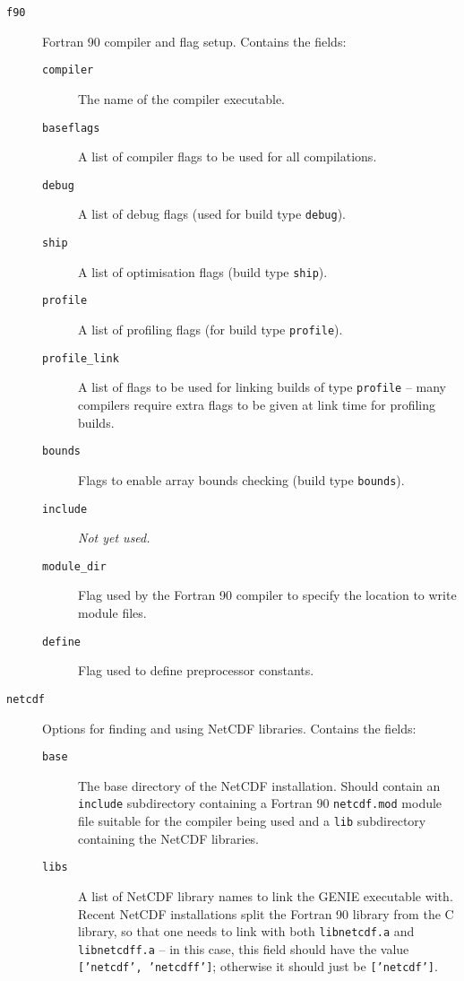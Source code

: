 \documentclass[a4paper,10pt,article]{memoir}
\begin{document}
\begin{description}
  \item[\texttt{f90}]{Fortran 90 compiler and flag setup.  Contains
    the fields:
    \begin{description}
      \item[\texttt{compiler}]{The name of the compiler executable.}
      \item[\texttt{baseflags}]{A list of compiler flags to be used
        for all compilations.}
      \item[\texttt{debug}]{A list of debug flags (used for build type
        \texttt{debug}).}
      \item[\texttt{ship}]{A list of optimisation flags (build type
        \texttt{ship}).}
      \item[\texttt{profile}]{A list of profiling flags (for build type
        \texttt{profile}).}
      \item[\texttt{profile\_link}]{A list of flags to be used for
        linking builds of type \texttt{profile} -- many compilers
        require extra flags to be given at link time for profiling
        builds.}
      \item[\texttt{bounds}]{Flags to enable array bounds checking
        (build type \texttt{bounds}).}
      \item[\texttt{include}]{\emph{Not yet used.}}
      \item[\texttt{module\_dir}]{Flag used by the Fortran 90 compiler
        to specify the location to write module files.}
      \item[\texttt{define}]{Flag used to define preprocessor
        constants.}
    \end{description}}
  \item[\texttt{netcdf}]{Options for finding and using NetCDF
    libraries.  Contains the fields:
    \begin{description}
      \item[\texttt{base}]{The base directory of the NetCDF
        installation.  Should contain an \texttt{include} subdirectory
        containing a Fortran 90 \texttt{netcdf.mod} module file
        suitable for the compiler being used and a \texttt{lib}
        subdirectory containing the NetCDF libraries.}
      \item[\texttt{libs}]{A list of NetCDF library names to link the
        GENIE executable with.  Recent NetCDF installations split the
        Fortran 90 library from the C library, so that one needs to
        link with both \texttt{libnetcdf.a} and \texttt{libnetcdff.a}
        -- in this case, this field should have the value
        \texttt{['netcdf', 'netcdff']}; otherwise it should just be
        \texttt{['netcdf']}.}
    \end{description}}
\end{description}
\end{document}

